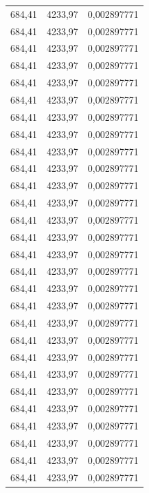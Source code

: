 \begin{center}
\begin{longtable}{|l|l|l|}
684,41            & 4233,97           & 0,002897771 \\
684,41            & 4233,97           & 0,002897771 \\
684,41            & 4233,97           & 0,002897771 \\
684,41            & 4233,97           & 0,002897771 \\
684,41            & 4233,97           & 0,002897771 \\
684,41            & 4233,97           & 0,002897771 \\
684,41            & 4233,97           & 0,002897771 \\
684,41            & 4233,97           & 0,002897771 \\
684,41            & 4233,97           & 0,002897771 \\
684,41            & 4233,97           & 0,002897771 \\
684,41            & 4233,97           & 0,002897771 \\
684,41            & 4233,97           & 0,002897771 \\
684,41            & 4233,97           & 0,002897771 \\
684,41            & 4233,97           & 0,002897771 \\
684,41            & 4233,97           & 0,002897771 \\
684,41            & 4233,97           & 0,002897771 \\
684,41            & 4233,97           & 0,002897771 \\
684,41            & 4233,97           & 0,002897771 \\
684,41            & 4233,97           & 0,002897771 \\
684,41            & 4233,97           & 0,002897771 \\
684,41            & 4233,97           & 0,002897771 \\
684,41            & 4233,97           & 0,002897771 \\
684,41            & 4233,97           & 0,002897771 \\
684,41            & 4233,97           & 0,002897771 \\
684,41            & 4233,97           & 0,002897771 \\
684,41            & 4233,97           & 0,002897771 \\
684,41            & 4233,97           & 0,002897771 \\
684,41            & 4233,97           & 0,002897771 \\

\end{longtable}
\end{center}
